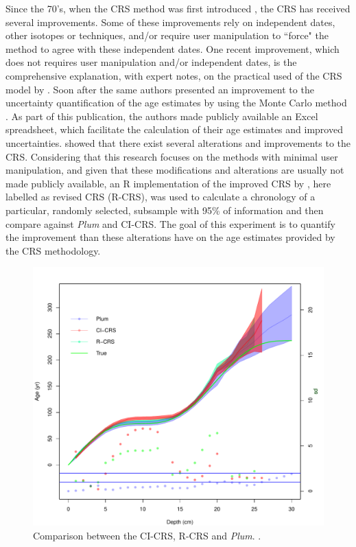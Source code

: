 \documentclass [10pt] {article}
\begin{document}
Since the 70's, when the CRS method was first introduced \citep{Appleby1978,Robbins1978}, the CRS has received several improvements. 
Some of these improvements rely on independent dates, other isotopes or techniques, and/or require user manipulation to ``force" the method to agree with these independent dates.
One recent improvement, which does not requires user manipulation and/or independent dates, is the comprehensive explanation, with expert notes, on the practical used of the CRS model by \citet{Sanchez-Cabeza2012}. 
Soon after the same authors presented an improvement to the uncertainty quantification of the age estimates by using the Monte Carlo method \citep{Sanchez-Cabeza2014}.
As part of this publication, the authors made publicly available an Excel spreadsheet, which facilitate the calculation of their age estimates and improved uncertainties. 
\citet{Barsanti2020} showed that there exist several alterations and improvements to the CRS. 
Considering that this research focuses on the methods with minimal user manipulation, and given that these modifications and alterations are usually not made publicly available, an R implementation of the improved CRS by \citet{Sanchez-Cabeza2014}, here labelled as revised CRS (R-CRS), was used to calculate a chronology of a particular, randomly selected, subsample with 95\% of information and then compare against \textit{Plum} and CI-CRS.
The goal of this experiment is to quantify the improvement than these alterations have on the age estimates provided by the CRS methodology.

\begin{figure}[h!]
 \centering
  \includegraphics[width=.95\linewidth]{95Comparison.pdf}
	\caption{Comparison between the CI-CRS, R-CRS and \textit{Plum}.  .} 
  \label{fig:95compa}
\end{figure}
\end{document}
